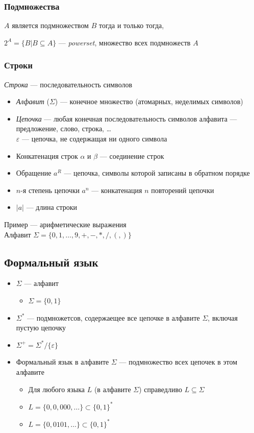 \documentclass[a4paper, 14pt]{extarticle}
\begin{document}
\subsubsection*{Подмножества}
$A$ является подмножеством $B$ тогда и только тогда, %

$2^A = \{ B | B \subseteq A \}$ --- \textit{powerset}, множество всех подмножеств $A$ 

\subsubsection*{Строки}
\textit{Строка} --- последовательность символов
\begin{itemize}
    \item \textit{Алфавит} ($\Sigma$) --- конечное множество (атомарных, неделимых символов)
    \item \textit{Цепочка} --- любая конечная последовательность символов алфавита --- предложение, слово, строка, \ldots{}\\
    $\varepsilon$ --- цепочка, не содержащая ни одного символа
    \item Конкатенация строк $\alpha$ и $\beta$ --- соединение строк
    \item Обращение $a^R$ --- цепочка, символы которой записаны в обратном порядке
    \item $n$-я степень цепочки $a^n$ --- конкатенация $n$ повторений цепочки
    \item $|a|$ --- длина строки
\end{itemize}
Пример --- арифметические выражения\\
Алфавит $\Sigma = \{0, 1, \ldots, 9, +, -, *, /, (, )\}$

\subsection{Формальный язык}
\begin{itemize}
    \item $\Sigma$ --- алфавит
        \begin{itemize}
            \item $\Sigma = \{0, 1\}$
        \end{itemize}
    \item $\Sigma^*$ --- подмножетсов, содержаещее все цепочке в алфавите $\Sigma$, включая пустую цепочку
    \item $\Sigma^+ = \Sigma^* / \{\varepsilon \} $
    \item Формальный язык в алфавите $\Sigma$ --- подмножество всех цепочек в этом алфавите
    \begin{itemize}
        \item Для любого языка $L$ (в алфавите $\Sigma$) справедливо $L\subseteq \Sigma $
    \item $L = \{0, 0, 000, \ldots \} \subset {\{0,1\}}^*$
    \item $L = \{ 0, 0101, \ldots \} \subset {\{ 0, 1 \}}^*$
    \end{itemize}
\end{itemize}
\end{document}
